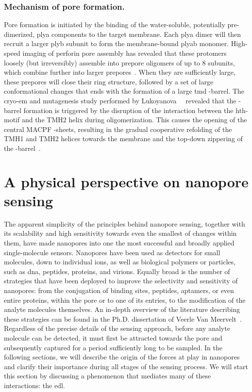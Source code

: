 \subsubsection{Mechanism of pore formation.}
%

Pore formation is initiated by the binding of the water-soluble, potentially pre-dimerized, \gls{plya}
components to the target membrane. Each \gls{plya} dimer will then recruit a larger \gls{plyb} subunit to form
the membrane-bound \gls{plyab} monomer. High-speed imaging of perforin pore assembly has revealed that these
protomers loosely (but irreversibly) assemble into prepore oligomers of up to 8 subunits, which combine
further into larger prepores~\cite{Leung-2017}. When they are sufficiently large, these prepores will close
their ring structure, followed by a set of large conformational changes that ends with the formation of a
large \gls{tmd} \tb-barrel. The \gls{cryo-em} and mutagenesis study performed by
Lukoyanova~\etal{}~\cite{Lukoyanova-Kondos-2015} revealed that the \tb-barrel formation is triggered by the
disruption of the interaction between the \gls{hth}-motif and the {TMH2} helix during oligomerization. This
causes the opening of the central {MACPF} \tb-sheets, resulting in the gradual cooperative refolding of the
{TMH1} and {TMH2} helices towards the membrane and the top-down zippering of the
\tb-barrel~\cite{Reboul-2016}.


%
\clearpage
%

%
%
\section{A physical perspective on nanopore sensing}
%
\label{sec:np:physical_perspective}
%

The apparent simplicity of the principles behind nanopore sensing, together with its scalability and high
sensitivity towards even the smallest of changes within them, have made nanopores into one the most successful
and broadly applied single-molecule sensors. Nanopores have been used as detectors for small molecules, down
to individual ions, as well as biological polymers or particles, such as \gls{dna}, peptides, proteins, and
virions. Equally broad is the number of strategies that have been deployed to improve the selectivity and
sensitivity of nanopores: from the conjugation of binding sites, peptides, aptamers, or even entire proteins,
within the pore or to one of its entries, to the modification of the analyte molecules themselves. An in-depth
overview of the literature describing these strategies can be found in the Ph.D. dissertation of Veerle Van
Meervelt~\cite{VanMeervelt-2017-PhD}. Regardless of the precise details of the sensing approach, before any
analyte molecule can be detected, it must first be attracted towards the pore and subsequently captured for
a period sufficiently long to be sampled. In the following sections, we will describe the origin of
the forces at play in nanopores and clarify their importance during all stages of the sensing process. We will
start this section by discussing a phenomenon that mediates many of these interactions: the \gls{edl}.


